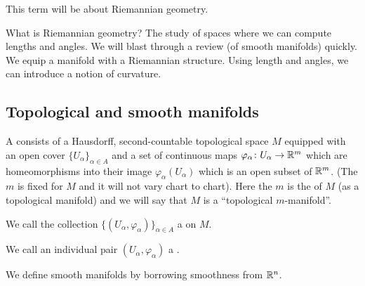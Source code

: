 
\lecture{}

\begin{node}
This term will be about Riemannian geometry.
\end{node}

\begin{node}
What is Riemannian geometry? The study of spaces where we can compute
lengths and angles. We will blast through a review (of smooth
manifolds) quickly. We equip a manifold with a Riemannian
structure. Using length and angles, we can introduce a notion of curvature.
\end{node}

\subsection{Topological and smooth manifolds}

\begin{definition}
A  consists of a Hausdorff,
second-countable topological space $M$ equipped with an open cover
$\{U_{\alpha}\}_{\alpha\in A}$ and a set of continuous maps
$\varphi_{\alpha}\colon U_{\alpha}\to\mathbb{R}^{m}$ which are homeomorphisms
into their image $\varphi_{\alpha}(U_{\alpha})$ which is an open
subset of $\mathbb{R}^{m}$. (The $m$ is fixed for $M$ and it will not vary
chart to chart). Here the $m$ is the  of $M$ (as a
topological manifold) and we will say that $M$ is a ``topological $m$-manifold''.
\end{definition}

\begin{definition}
We call the collection $\{(U_{\alpha},\varphi_{\alpha})\}_{\alpha\in A}$
a  on $M$.

We call an individual pair $(U_{\alpha},\varphi_{\alpha})$ a
.
\end{definition}

\begin{node}
We define smooth manifolds by borrowing smoothness from $\mathbb{R}^{n}$.
\end{node}

